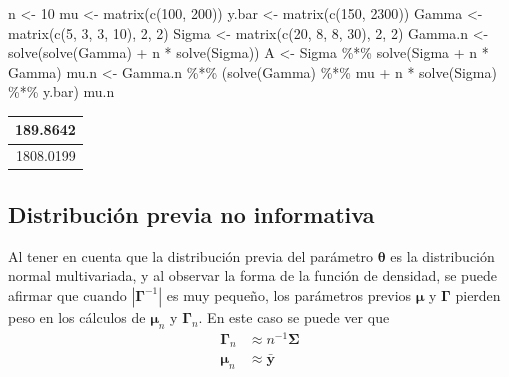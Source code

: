 \documentclass[
  10pt,
  spanish,
]{book}
\newenvironment{Shaded}{\begin{snugshade}}{\end{snugshade}}
\newcommand{\DecValTok}[1]{\textcolor[rgb]{0.00,0.00,0.81}{#1}}
\newcommand{\FunctionTok}[1]{\textcolor[rgb]{0.00,0.00,0.00}{#1}}
\newcommand{\NormalTok}[1]{#1}
\newcommand{\OtherTok}[1]{\textcolor[rgb]{0.56,0.35,0.01}{#1}}
\newcommand{\SpecialCharTok}[1]{\textcolor[rgb]{0.00,0.00,0.00}{#1}}
\theoremstyle{definition}
\theoremstyle{definition}
\theoremstyle{definition}
\theoremstyle{definition}
\theoremstyle{remark}
\begin{document}
\begin{Shaded}
\begin{Highlighting}[]
\NormalTok{n }\OtherTok{\textless{}{-}} \DecValTok{10}
\NormalTok{mu }\OtherTok{\textless{}{-}} \FunctionTok{matrix}\NormalTok{(}\FunctionTok{c}\NormalTok{(}\DecValTok{100}\NormalTok{, }\DecValTok{200}\NormalTok{))}
\NormalTok{y.bar }\OtherTok{\textless{}{-}} \FunctionTok{matrix}\NormalTok{(}\FunctionTok{c}\NormalTok{(}\DecValTok{150}\NormalTok{, }\DecValTok{2300}\NormalTok{))}
\NormalTok{Gamma }\OtherTok{\textless{}{-}} \FunctionTok{matrix}\NormalTok{(}\FunctionTok{c}\NormalTok{(}\DecValTok{5}\NormalTok{, }\DecValTok{3}\NormalTok{, }\DecValTok{3}\NormalTok{, }\DecValTok{10}\NormalTok{), }\DecValTok{2}\NormalTok{, }\DecValTok{2}\NormalTok{)}
\NormalTok{Sigma }\OtherTok{\textless{}{-}} \FunctionTok{matrix}\NormalTok{(}\FunctionTok{c}\NormalTok{(}\DecValTok{20}\NormalTok{, }\DecValTok{8}\NormalTok{, }\DecValTok{8}\NormalTok{, }\DecValTok{30}\NormalTok{), }\DecValTok{2}\NormalTok{, }\DecValTok{2}\NormalTok{)}
\NormalTok{Gamma.n }\OtherTok{\textless{}{-}} \FunctionTok{solve}\NormalTok{(}\FunctionTok{solve}\NormalTok{(Gamma) }\SpecialCharTok{+}\NormalTok{ n }\SpecialCharTok{*} \FunctionTok{solve}\NormalTok{(Sigma))}
\NormalTok{A }\OtherTok{\textless{}{-}}\NormalTok{ Sigma }\SpecialCharTok{\%*\%} \FunctionTok{solve}\NormalTok{(Sigma }\SpecialCharTok{+}\NormalTok{ n }\SpecialCharTok{*}\NormalTok{ Gamma) }
\NormalTok{mu.n }\OtherTok{\textless{}{-}}\NormalTok{ Gamma.n }\SpecialCharTok{\%*\%} 
\NormalTok{  (}\FunctionTok{solve}\NormalTok{(Gamma) }\SpecialCharTok{\%*\%}\NormalTok{ mu }\SpecialCharTok{+}\NormalTok{ n }\SpecialCharTok{*} \FunctionTok{solve}\NormalTok{(Sigma) }\SpecialCharTok{\%*\%}\NormalTok{ y.bar)}
\NormalTok{mu.n}
\end{Highlighting}
\end{Shaded}

\begin{tabular}{r}
\hline
189.8642\\
\hline
1808.0199\\
\hline
\end{tabular}

\hypertarget{distribuciuxf3n-previa-no-informativa}{%
\subsection{Distribución previa no informativa}\label{distribuciuxf3n-previa-no-informativa}}

Al tener en cuenta que la distribución previa del parámetro \(\boldsymbol \theta\) es la distribución normal multivariada, y al observar la forma de la función de densidad, se puede afirmar que cuando \(|\boldsymbol \Gamma^{-1}|\) es muy pequeño, los parámetros previos \(\boldsymbol \mu\) y \(\boldsymbol \Gamma\) pierden peso en los cálculos de \(\boldsymbol \mu_n\) y \(\boldsymbol \Gamma_n\). En este caso se puede ver que
\begin{align*}
\boldsymbol \Gamma_n&\approx n^{-1}\boldsymbol \Sigma\\
\boldsymbol \mu_n&\approx \bar{\mathbf{y}}
\end{align*}
\end{document}
